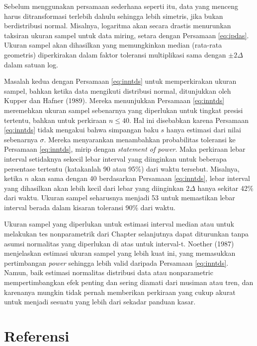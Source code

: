 \documentclass[]{book}
\begin{document}
Sebelum menggunakan persamaan sederhana seperti itu, data yang menceng
harus ditransformasi terlebih dahulu sehingga lebih simetris, jika bukan
berdistribusi normal. Misalnya, logaritma akan secara drastis menurunkan
taksiran ukuran sampel untuk data miring, setara dengan Persamaan
\eqref{eq:ipdas}. Ukuran sampel akan dihasilkan yang memungkinkan median
(rata-rata geometris) diperkirakan dalam faktor toleransi multiplikasi
sama dengan \(\pm2\Delta\)dalam satuan log.

Masalah kedua dengan Persamaan \eqref{eq:inntds} untuk memperkirakan
ukuran sampel, bahkan ketika data mengikuti distribusi normal,
ditunjukkan oleh Kupper dan Hafner (1989). Mereka menunjukkan Persamaan
\eqref{eq:inntds} meremehkan ukuran sampel sebenarnya yang diperlukan
untuk tingkat presisi tertentu, bahkan untuk perkiraan \(n\le40\). Hal
ini disebabkan karena Persamaan \eqref{eq:inntds} tidak mengakui bahwa
simpangan baku \(s\) hanya estimasi dari nilai sebenarnya \(\sigma\).
Mereka menyarankan menambahkan probabilitas toleransi ke Persamaan
\eqref{eq:inntds}, mirip dengan \emph{statement of power}. Maka perkiraan
lebar interval setidaknya sekecil lebar interval yang diinginkan untuk
beberapa persentase tertentu (katakanlah 90 atau 95\%) dari waktu
tersebut. Misalnya, ketika \(n\) akan sama dengan 40 berdasarkan
Persamaan \eqref{eq:inntds}, lebar interval yang dihasilkan akan lebih
kecil dari lebar yang diinginkan \(2\Delta\) hanya sekitar 42\% dari
waktu. Ukuran sampel seharusnya menjadi 53 untuk memastikan lebar
interval berada dalam kisaran toleransi 90\% dari waktu.

Ukuran sampel yang diperlukan untuk estimasi interval median atau untuk
melakukan tes nonparametrik dari Chapter selanjutnya dapat diturunkan
tanpa asumsi normalitas yang diperlukan di atas untuk interval-t.
Noether (1987) menjelaskan estimasi ukuran sampel yang lebih kuat ini,
yang memasukkan pertimbangan \emph{power} sehingga lebih valid daripada
Persamaan \eqref{eq:inntds}. Namun, baik estimasi normalitas distribusi
data atau nonparametric mempertimbangkan efek penting dan sering diamati
dari musiman atau tren, dan karenanya mungkin tidak pernah memberikan
perkiraan yang cukup akurat untuk menjadi sesuatu yang lebih dari
sekadar panduan kasar.

\section{Referensi}\label{referensi-8}
\end{document}
